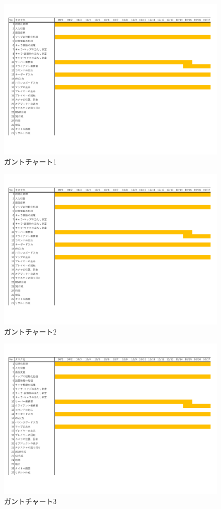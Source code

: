 \documentclass{jarticle}
\begin{document}
\begin{figure}[H]
    \centering
    \label{table:gunt1}
    \caption{ガントチャート1}
    \includegraphics[scale=0.5, page=1]{gunt.pdf}
\end{figure}
\begin{figure}[H]
    \centering
    \label{table:gunt1}
    \caption{ガントチャート2}
    \includegraphics[scale=0.5, page=2]{gunt.pdf}
\end{figure}
\begin{figure}[H]
    \centering
    \label{table:gunt1}
    \caption{ガントチャート3}
    \includegraphics[scale=0.5, page=3]{gunt.pdf}
\end{figure}
\end{document}
